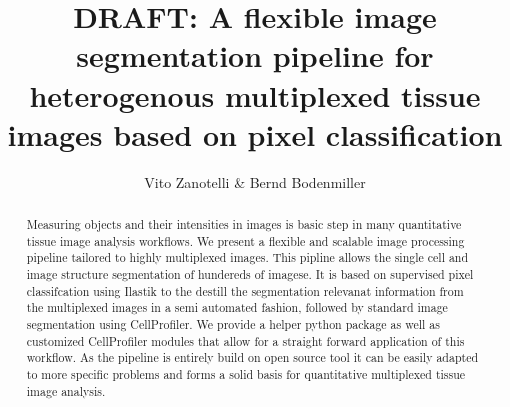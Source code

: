 \documentclass[a4paper]{article}
\title{DRAFT: A flexible image segmentation pipeline for heterogenous multiplexed tissue images based on pixel classification}
\author{Vito Zanotelli \& Bernd Bodenmiller}
\begin{document}
\maketitle

\begin{abstract}
Measuring objects and their intensities in images is basic step in many quantitative tissue image
analysis workflows. We present a flexible and scalable image processing pipeline tailored to
highly multiplexed images. This pipline allows the single cell and image structure segmentation of
hundereds of imagese. It is based on supervised pixel classifcation using Ilastik to the destill the
segmentation relevanat information from the multiplexed images in a semi automated fashion,
followed by standard image segmentation using CellProfiler. We provide a helper python package as
well as customized CellProfiler modules that allow for a straight forward application of this
workflow. As the pipeline is entirely build on open source tool it can be easily adapted to more
specific problems and forms a solid basis for quantitative multiplexed tissue image analysis.

\end{abstract}
\end{document}
